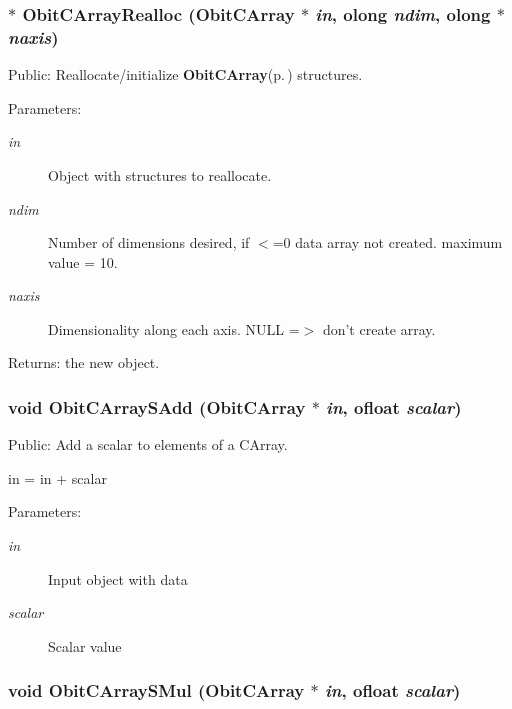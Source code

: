 \subsubsection{$\ast$ Obit\-CArray\-Realloc ({\bf Obit\-CArray} $\ast$ {\em in}, {\bf olong} {\em ndim}, {\bf olong} $\ast$ {\em naxis})}\label{ObitCArray_8c_a11}


Public: Reallocate/initialize {\bf Obit\-CArray}{\rm (p.\,\pageref{structObitCArray})} structures. 

\begin{Desc}
\item[Parameters:]
\begin{description}
\item[{\em in}]Object with structures to reallocate. \item[{\em ndim}]Number of dimensions desired, if $<$=0 data array not created. maximum value = 10. \item[{\em naxis}]Dimensionality along each axis. NULL =$>$ don't create array. \end{description}
\end{Desc}
\begin{Desc}
\item[Returns:]the new object. \end{Desc}
\subsubsection{\setlength{\rightskip}{0pt plus 5cm}void Obit\-CArray\-SAdd ({\bf Obit\-CArray} $\ast$ {\em in}, {\bf ofloat} {\em scalar})}\label{ObitCArray_8c_a18}


Public: Add a scalar to elements of a CArray. 

in = in + scalar \begin{Desc}
\item[Parameters:]
\begin{description}
\item[{\em in}]Input object with data \item[{\em scalar}]Scalar value \end{description}
\end{Desc}
\subsubsection{\setlength{\rightskip}{0pt plus 5cm}void Obit\-CArray\-SMul ({\bf Obit\-CArray} $\ast$ {\em in}, {\bf ofloat} {\em scalar})}\label{ObitCArray_8c_a19}


